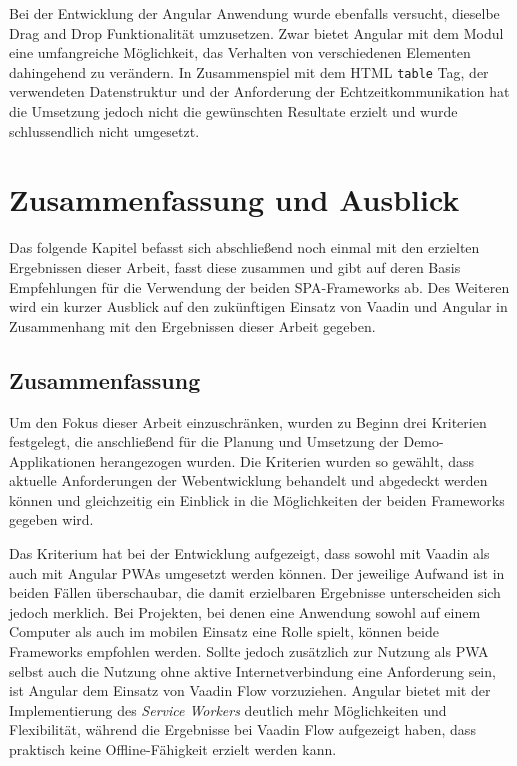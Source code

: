 \documentclass[a4paper,12pt,twoside]{scrreprt}
\begin{document}
\medskip

Bei der Entwicklung der Angular Anwendung wurde ebenfalls versucht, dieselbe Drag and Drop Funktionalität umzusetzen. Zwar bietet Angular mit dem  Modul eine umfangreiche Möglichkeit, das Verhalten von verschiedenen Elementen dahingehend zu verändern. In Zusammenspiel mit dem HTML \texttt{table} Tag, der verwendeten Datenstruktur und der Anforderung der Echtzeitkommunikation hat die Umsetzung jedoch nicht die gewünschten Resultate erzielt und wurde schlussendlich nicht umgesetzt.

\chapter{Zusammenfassung und Ausblick}
\label{chap:zusammenfassung-ausblick}
Das folgende Kapitel befasst sich abschließend noch einmal mit den erzielten Ergebnissen dieser Arbeit, fasst diese zusammen und gibt auf deren Basis Empfehlungen für die Verwendung der beiden \ac{SPA}-Frameworks ab. Des Weiteren wird ein kurzer Ausblick auf den zukünftigen Einsatz von Vaadin und Angular in Zusammenhang mit den Ergebnissen dieser Arbeit gegeben.

\section{Zusammenfassung}
\label{sec:zusammenfassung}
Um den Fokus dieser Arbeit einzuschränken, wurden zu Beginn drei Kriterien festgelegt, die anschließend für die Planung und Umsetzung der Demo-Applikationen herangezogen wurden. Die Kriterien wurden so gewählt, dass aktuelle Anforderungen der Webentwicklung behandelt und abgedeckt werden können und gleichzeitig ein Einblick in die Möglichkeiten der beiden Frameworks gegeben wird.

\medskip

Das Kriterium \textit{} hat bei der Entwicklung aufgezeigt, dass sowohl mit Vaadin als auch mit Angular \acp{PWA} umgesetzt werden können. Der jeweilige Aufwand ist in beiden Fällen überschaubar, die damit erzielbaren Ergebnisse unterscheiden sich jedoch merklich. Bei Projekten, bei denen eine Anwendung sowohl auf einem Computer als auch im mobilen Einsatz eine Rolle spielt, können beide Frameworks empfohlen werden. Sollte jedoch zusätzlich zur Nutzung als \ac{PWA} selbst auch die Nutzung ohne aktive Internetverbindung eine Anforderung sein, ist Angular dem Einsatz von Vaadin Flow vorzuziehen. Angular bietet mit der Implementierung des \textit{Service Workers} deutlich mehr Möglichkeiten und Flexibilität, während die Ergebnisse bei Vaadin Flow aufgezeigt haben, dass praktisch keine Offline-Fähigkeit erzielt werden kann.
\end{document}
